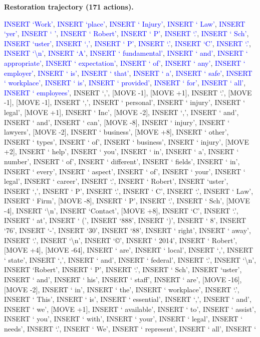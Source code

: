 \documentclass[11pt]{article}
\begin{document}
\vspace{0.4em}
\textbf{Restoration trajectory (171 actions).}\par
{
\ttfamily\scriptsize\raggedright\setlength{\parindent}{0pt}
\textcolor{blue}{INSERT `Work'}, \textcolor{blue}{INSERT `place'}, \textcolor{blue}{INSERT ` Injury'}, \textcolor{blue}{INSERT ` Law'}, \textcolor{blue}{INSERT `yer'}, \textcolor{blue}{INSERT ` \textbar{}'}, \textcolor{blue}{INSERT ` Robert'}, \textcolor{blue}{INSERT ` P'}, \textcolor{blue}{INSERT `.'}, \textcolor{blue}{INSERT ` Sch'}, \textcolor{blue}{INSERT `uster'}, \textcolor{blue}{INSERT `,'}, \textcolor{blue}{INSERT ` P'}, \textcolor{blue}{INSERT `.'}, \textcolor{blue}{INSERT `C'}, \textcolor{blue}{INSERT `.'}, \textcolor{blue}{INSERT `\textbackslash{}n'}, \textcolor{blue}{INSERT `A'}, \textcolor{blue}{INSERT ` fundamental'}, \textcolor{blue}{INSERT ` and'}, \textcolor{blue}{INSERT ` appropriate'}, \textcolor{blue}{INSERT ` expectation'}, \textcolor{blue}{INSERT ` of'}, \textcolor{blue}{INSERT ` any'}, \textcolor{blue}{INSERT ` employer'}, \textcolor{blue}{INSERT ` is'}, \textcolor{blue}{INSERT ` that'}, \textcolor{blue}{INSERT ` a'}, \textcolor{blue}{INSERT ` safe'}, \textcolor{blue}{INSERT ` workplace'}, \textcolor{blue}{INSERT ` is'}, \textcolor{blue}{INSERT ` provided'}, \textcolor{blue}{INSERT ` for'}, \textcolor{blue}{INSERT ` all'}, \textcolor{blue}{INSERT ` employees'}, INSERT `,', [MOVE -1], [MOVE +1], INSERT `.', [MOVE -1], [MOVE -1], INSERT `,', INSERT ` personal', INSERT ` injury', INSERT ` legal', [MOVE +1], INSERT ` Inc', [MOVE -2], INSERT `,', INSERT ` and', INSERT ` and', INSERT ` can', [MOVE -8], INSERT ` injury', INSERT ` lawyers', [MOVE -2], INSERT ` business', [MOVE +8], INSERT ` other', INSERT ` types', INSERT ` of', INSERT ` business', INSERT ` injury', [MOVE +2], INSERT ` help', INSERT ` you', INSERT ` in', INSERT ` a', INSERT ` number', INSERT ` of', INSERT ` different', INSERT ` fields', INSERT ` in', INSERT ` every', INSERT ` aspect', INSERT ` of', INSERT ` your', INSERT ` legal', INSERT ` career', INSERT `.', INSERT ` Robert', INSERT `uster', INSERT `,', INSERT ` P', INSERT `.', INSERT ` C', INSERT `.', INSERT ` Law', INSERT ` Firm', [MOVE -8], INSERT ` P', INSERT `.', INSERT ` Sch', [MOVE -4], INSERT `\textbackslash{}n', INSERT `Contact', [MOVE +8], INSERT `C', INSERT `.', INSERT ` at', INSERT ` (', INSERT `888', INSERT `)', INSERT ` 8', INSERT `76', INSERT `-', INSERT `30', INSERT `88', INSERT ` right', INSERT ` away', INSERT `.', INSERT `\textbackslash{}n', INSERT `©', INSERT ` 2014', INSERT ` Robert', [MOVE +4], [MOVE -64], INSERT ` are', INSERT ` local', INSERT `,', INSERT ` state', INSERT `,', INSERT ` and', INSERT ` federal', INSERT `.', INSERT `\textbackslash{}n', INSERT `Robert', INSERT ` P', INSERT `.', INSERT ` Sch', INSERT `uster', INSERT ` and', INSERT ` his', INSERT ` staff', INSERT ` are', [MOVE -16], [MOVE -2], INSERT ` in', INSERT ` the', INSERT ` workplace', INSERT `.', INSERT ` This', INSERT ` is', INSERT ` essential', INSERT `,', INSERT ` and', INSERT ` we', [MOVE +1], INSERT ` available', INSERT ` to', INSERT ` assist', INSERT ` you', INSERT ` with', INSERT ` your', INSERT ` legal', INSERT ` needs', INSERT `.', INSERT ` We', INSERT ` represent', INSERT ` all', INSERT ` }
\end{document}
